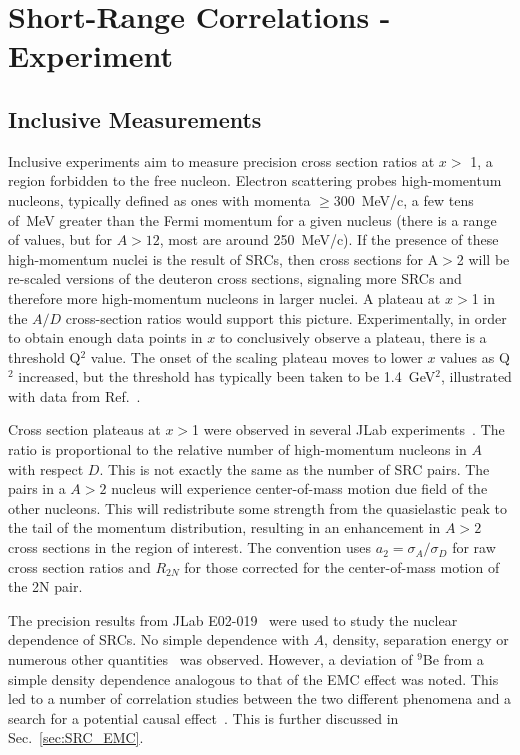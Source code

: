 \section{Short-Range Correlations - Experiment}
\subsection{Inclusive Measurements}
Inclusive experiments aim to measure precision cross section ratios at $x >$ 1, a region forbidden to the free nucleon.   Electron scattering probes high-momentum nucleons, typically defined as ones with momenta $\ge$300~MeV/c, a few tens of~MeV greater than the Fermi momentum for a given nucleus (there is a range of values, but for $A>12$, most are around 250~MeV/c). If the presence of these high-momentum nuclei is the result of SRCs, then cross sections for A$>$2 will be re-scaled versions of the deuteron cross sections, signaling more SRCs and therefore more high-momentum nucleons in larger nuclei.   A plateau at $x>$1 in the $A/D$ cross-section ratios would support this picture.    Experimentally, in order to obtain enough data points in $x$ to conclusively observe a plateau, there is a threshold Q$^2$ value.  The onset of the scaling plateau moves to lower $x$ values as Q$^2$ increased, but the threshold has typically been taken to be 1.4~GeV$^2$, illustrated with data from Ref.~\cite{egiyan2003}.

Cross section plateaus at $x>$1 were observed in several JLab experiments~\cite{egiyan2003, fomin2012}.  The ratio is proportional to the relative number of high-momentum nucleons in $A$ with respect $D$.  This is not exactly the same as the number of SRC pairs.   The pairs in a $A>2$ nucleus will experience center-of-mass motion due field of the other nucleons.  This will redistribute some strength from the quasielastic peak to the tail of the momentum distribution, resulting in an enhancement in $A>2$ cross sections in the region of interest.  The convention uses $a_2=\sigma_A/\sigma_D$ for raw cross section ratios and $R_{2N}$ for those corrected for the center-of-mass motion of the 2N pair. 


The precision results from JLab E02-019~\cite{fomin2012} were used to study the nuclear dependence of SRCs. No simple dependence with $A$, density, separation energy or numerous other quantities~\cite{arrington12} was observed.  However, a deviation of $^9$Be from a simple density dependence analogous to that of the EMC effect was noted.  This led to a number of correlation studies between the two different phenomena and a search for a potential causal effect~\cite{arrington12, Hen:2012fm, Weinstein:2010rt}.  This is further discussed in Sec.~\ref{sec:SRC_EMC}.

